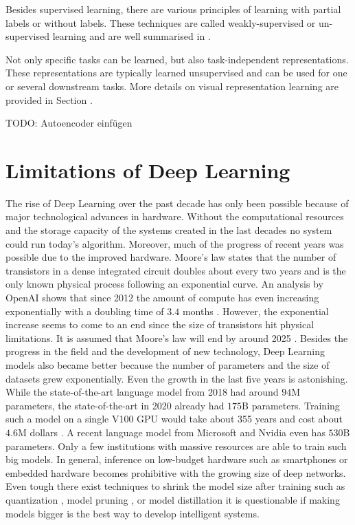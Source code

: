 Besides supervised learning, there are various principles of learning with partial labels or without labels.
These techniques are called weakly-supervised or un-supervised learning and are well summarised in .

Not only specific tasks can be learned, but also task-independent representations.
These representations are typically learned unsupervised and can be used for one or several downstream tasks.
More details on visual representation learning are provided in Section .

 TODO: Autoencoder einfügen

\section{Limitations of Deep Learning}
The rise of Deep Learning over the past decade has only been possible because of major technological advances in hardware.
Without the computational resources and the storage capacity of the systems created in the last decades no system could run today's algorithm.
Moreover, much of the progress of recent years was possible due to the improved hardware. 
Moore’s law \cite{Moore_2006} states that the number of transistors in a dense integrated circuit doubles about every two years and is the only known physical process following an exponential curve.
An analysis by OpenAI shows that since 2012 the amount of compute has even increasing exponentially with a doubling time  of \(3.4\) months \cite{OpenAI_compute}.
However, the exponential increase seems to come to an end since the size of transistors hit physical limitations.
It is assumed that Moore's law will end by around 2025 .
Besides the progress in the field and the development of new technology, Deep Learning models also became better because the number of parameters and the size of datasets grew exponentially.
Even the growth in the last five years is astonishing.
While the state-of-the-art language model from 2018  had around \(94\)M parameters, the state-of-the-art in 2020  already had \(175\)B parameters. Training such a model on a single V100 GPU would take about 355 years and cost about \(4.6\)M dollars \cite{Lambda_GPT3}.
A recent language model from Microsoft and Nvidia  even has \(530\)B parameters.
Only a few institutions with massive resources are able to train such big models.
In general, inference on low-budget hardware such as smartphones or embedded hardware becomes prohibitive with the growing size of deep networks.
Even tough there exist techniques to shrink the model size after training such as quantization \cite{Wu_Judd_Zhang_Isaev_Micikevicius_2020}, model pruning \cite{Choudhary_Mishra_Goswami_Sarangapani_2020}, or model distillation \cite{Hinton_Vinyals_Dean_2015} it is questionable if making models bigger is the best way to develop intelligent systems.

